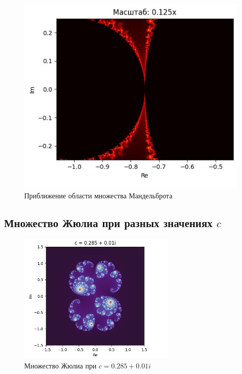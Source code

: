 \documentclass{article}
\begin{document}
	\begin{figure}[H]
		\centering
		\includegraphics[width=1\textwidth]{images/mandelbrot_zoom1.jpg}
		\caption{Приближение области множества Мандельброта}
		\label{fig:mandelbrot_zoom1}
	\end{figure}
	
	\subsection{Множество Жюлиа при разных значениях $c$}
	\begin{figure}[H]
		\centering
		\includegraphics[width=0.67\textwidth]{images/julia_c1.png}
		\caption{Множество Жюлиа при $c = 0.285 + 0.01i$}
		\label{fig:julia_c1}
	\end{figure}
	
\end{document}
